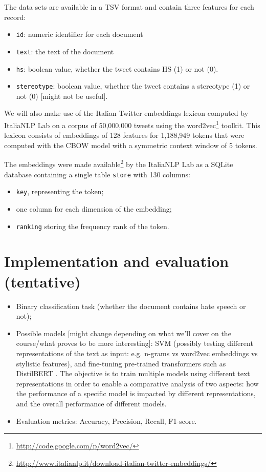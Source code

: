 \documentclass[a4paper, 10pt, twocolumn, DIV=calc]{scrartcl}
\begin{document}
The data sets are available in a TSV format and contain three features for each record:
\begin{itemize}
    \item{\texttt{id}:} numeric identifier for each document
    \item{\texttt{text}:} the text of the document
    \item{\texttt{hs}:} boolean value, whether the tweet contains HS (1) or not (0).
    \item{\texttt{stereotype}:} boolean value, whether the tweet contains a stereotype (1) or not (0) [might not be useful].
\end{itemize}

We will also make use of the Italian Twitter embeddings \cite{italian_twitter_embeddings} lexicon computed by ItaliaNLP Lab on a corpus of 50,000,000 tweets using the word2vec\footnote{\url{http://code.google.com/p/word2vec/}} toolkit.
This lexicon consists of embeddings of 128 features for 1,188,949 tokens that were computed with the CBOW model with a symmetric context window of 5 tokens.

The embeddings were made available\footnote{\url{http://www.italianlp.it/download-italian-twitter-embeddings/}} by the ItaliaNLP Lab as a SQLite database containing a single table \texttt{store} with 130 columns:
\begin{itemize}
    \item \texttt{key}, representing the token;
    \item one column for each dimension of the embedding;
    \item \texttt{ranking} storing the frequency rank of the token.
\end{itemize}


\section{Implementation and evaluation (tentative)}
\begin{itemize}
    \item Binary classification task (whether the document contains hate speech or not);
    \item Possible models [might change depending on what we’ll cover on the course/what proves to be more interesting]: SVM (possibly testing different representations of the text as input: e.g. n-grams vs word2vec embeddings vs stylistic features), and fine-tuning pre-trained transformers such as DistilBERT \cite{distilbert}.
    The objective is to train multiple models using different text representations in order to enable a comparative analysis of two aspects: how the performance of a specific model is impacted by different representations, and the overall performance of different models.
    
    \item Evaluation metrics: Accuracy, Precision, Recall, F1-score.
\end{itemize}
\end{document}
